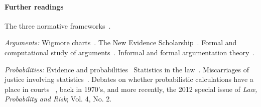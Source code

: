 \documentclass[10pt]{article}
\begin{document}

\paragraph{Further readings} 
The three normative frameworks~\citep{andersonEtal2005,kapteinEtal2009,dawidEtal2011}. 

\textit{Arguments:} Wigmore charts~\citep{wigmore1913,wigmore1931}. The New Evidence Scholarship~\citep{andersonEtal2005}. 
Formal and computational study of arguments~\citep{pollock1987,pollock1995}.
Informal and formal argumentation theory~\citep{vanEemerenEtal2014}.

\textit{Probabilities:}
Evidence and probabilities~\cite{schum1994,morteraDawid2007}
Statistics in the law~\citep{fenton2011}. Miscarriages of justice involving statistics~\citep{dawidEtal2011,schnepsColmez2013}.
Debates on whether probabilistic calculations have a place in courts ~\citet{finkelsteinFairley1970,tribe1971}, back in 
1970's, and more recently, the 2012 special issue of \textit{Law, Probability and Risk}; Vol. 4, No. 2. 
\end{document}

